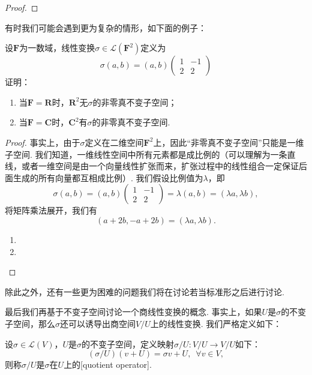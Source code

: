 \begin{proof}

\end{proof}

有时我们可能会遇到更为复杂的情形，如下面的例子：
\begin{example} \label{ex:18:不变子空间}
    设$\mathbf{F}$为一数域，线性变换$\sigma\in\mathcal{L}(\mathbf{F}^2)$定义为
    \[\sigma(a,b)=(a,b)\begin{pmatrix}
            1 & -1 \\ 2 & 2
        \end{pmatrix}\]
    证明：
    \begin{enumerate}
        \item 当$\mathbf{F}=\mathbf{R}$时，$\mathbf{R}^2$无$\sigma$的非零真不变子空间；

        \item 当$\mathbf{F}=\mathbf{C}$时，$\mathbf{C}^2$有$\sigma$的非零真不变子空间.
    \end{enumerate}
\end{example}

\begin{proof}
    事实上，由于$\sigma$定义在二维空间$\mathbf{F}^2$上，因此``非零真不变子空间''只能是一维子空间. 我们知道，一维线性空间中所有元素都是成比例的（可以理解为一条直线，或者一维空间是由一个向量线性扩张而来，扩张过程中的线性组合一定保证后面生成的所有向量都互相成比例）. 我们假设比例值为$\lambda$，即
    \[\sigma(a,b)=(a,b)\begin{pmatrix}
            1 & -1 \\ 2 & 2
        \end{pmatrix}=\lambda(a,b)=(\lambda a,\lambda b),\]
    将矩阵乘法展开，我们有
    \[(a+2b,-a+2b)=(\lambda a,\lambda b).\]
    \begin{enumerate}
        \item

        \item
    \end{enumerate}
\end{proof}

除此之外，还有一些更为困难的问题我们将在讨论若当标准形之后进行讨论.

最后我们再基于不变子空间讨论一个商线性变换的概念. 事实上，如果$U$是$\sigma$的不变子空间，那么$\sigma$还可以诱导出商空间$V/U$上的线性变换. 我们严格定义如下：
\begin{definition}
    设$\sigma\in \mathcal{L}(V)$，$U$是$\sigma$的不变子空间，定义映射$\sigma/U:V/U\to V/U$如下：
    \[(\sigma/U)(v+U)=\sigma v+U,\enspace\forall v\in V,\]
    则称$\sigma/U$是$\sigma$在$U$上的[quotient operator].
\end{definition}

